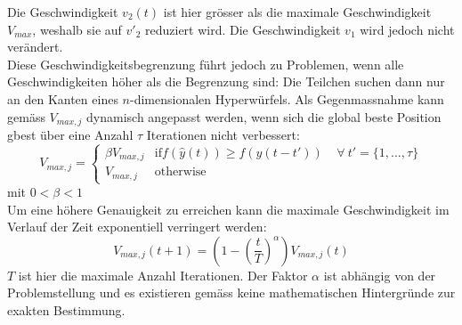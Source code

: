 Die Geschwindigkeit $v_2(t)$ ist hier grösser als die maximale Geschwindigkeit $V_{max}$, weshalb sie auf $v'_2$ reduziert wird. Die Geschwindigkeit $v_1$ wird jedoch nicht verändert. \\

Diese Geschwindigkeitsbegrenzung führt jedoch zu Problemen, wenn alle Geschwindigkeiten höher als die Begrenzung sind: Die Teilchen suchen dann nur an den Kanten eines $n$-dimensionalen Hyperwürfels. Als Gegenmassnahme kann gemäss \cite{schutte-sizing} $V_{max,j}$ dynamisch angepasst werden, wenn sich die global beste Position gbest über eine Anzahl $\tau$ Iterationen nicht verbessert:
\begin{equation}
	V_{max,j} = 
	\begin{cases}
		\beta V_{max,j} & \text{if} f(\hat{y}(t)) \geq f(\hat{y}(t-t')) 
			 \; \; \; \;  \forall \: t' = \{ 1, ..., \tau \} \\
		V_{max,j} & \text{otherwise}
	\end{cases}
\end{equation}
mit $0 < \beta < 1$ \\

Um eine höhere Genauigkeit zu erreichen kann die maximale Geschwindigkeit im Verlauf der Zeit exponentiell verringert werden:
\begin{equation}
	V_{max,j}(t+1) = \left(1-\left(\frac{t}{T}\right)^{\alpha}\right) V_{max,j}(t)
\end{equation}
$T$ ist hier die maximale Anzahl Iterationen. Der Faktor $\alpha$ ist abhängig von der Problemstellung und es existieren gemäss \cite{Han-Modification} keine mathematischen Hintergründe zur exakten Bestimmung. \\